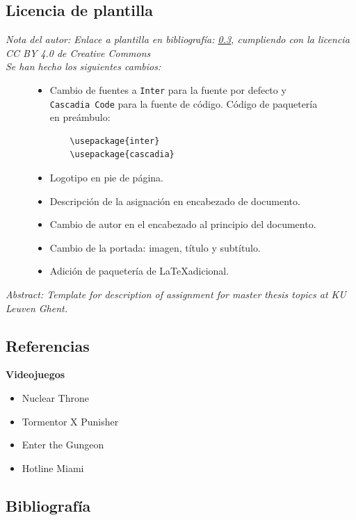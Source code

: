 \documentclass[12pt]{article}
\begin{document}
\begin{itemize}
    \subsection{Licencia de plantilla}
        \textit{Nota del autor: Enlace a plantilla en bibliografía: \ref{bibliografia}, cumpliendo con la licencia CC BY 4.0 de Creative Commons}\\
        \textit{Se han hecho los siguientes cambios:}
        \begin{figure}[H]
            \begin{itemize}
                \item Cambio de fuentes a \texttt{Inter} para la fuente por defecto y \texttt{Cascadia Code} para la fuente de código.
                Código de paquetería en preámbulo:
\begin{verbatim}
    \usepackage{inter}
    \usepackage{cascadia}
\end{verbatim}
                \item Logotipo en pie de página.
                \item Descripción de la asignación en encabezado de documento.
                \item Cambio de autor en el encabezado al principio del documento.
                \item Cambio de la portada: imagen, título y subtítulo.
                \item Adición de paquetería de \LaTeX adicional. 
            \end{itemize}
        \end{figure}
        \textit{Abstract: Template for description of assignment for master thesis topics at KU Leuven Ghent.}
        \end{itemize}
    \subsection{Referencias}
    
    \textbf{Videojuegos}
    \begin{itemize}
        \item Nuclear Throne \cite{vlaamber}
        \item Tormentor X Punisher \cite{E-Studio}
        \item Enter the Gungeon \cite{ETG}
        \item Hotline Miami \cite{dennaton}
    \end{itemize}

    \newpage
    \subsection{Bibliografía} \label{bibliografia}
        \printbibliography[heading = none]
        \nocite{*}
\end{document}
